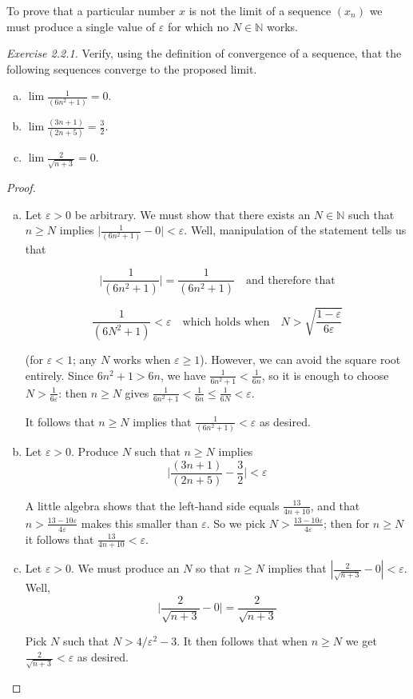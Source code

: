 To prove that a particular number $x$ is not the limit of a sequence $(x_{n})$ we must produce a single value of $\varepsilon$ for which no $N \in \mathbb{N}$ works.
\medskip

\noindent
\emph{Exercise 2.2.1.} Verify, using the definition of convergence of a sequence, that
the following sequences converge to the proposed limit.
\begin{enumerate}[(a)]
\item $\lim \frac{1}{(6n^{2}+1)} = 0$.
\item $\lim \frac{(3n+1)}{(2n+5)} = \frac{3}{2}$.
\item $\lim \frac{ 2}{\sqrt{n+3}} = 0$.
\end{enumerate}

\begin{proof}
	\begin{enumerate}[(a)]
			\item Let $\varepsilon > 0$ be arbitrary. We must show that there exists an
$N \in \mathbb{N}$ such that $n\geq N$ implies $\big|\frac{1}{(6n^{2}+1)} - 0 \big|  < \varepsilon$.  Well, manipulation of the statement tells us that 

$$\bigg|\frac{1}{(6n^{2}+1)} \bigg|  = \frac{1}{(6n^{2}+1)}  \quad \text{and therefore that}$$

$$ \frac{1}{(6N^{2}+1)}  < \varepsilon \quad \text{which holds when} \quad N > \sqrt{\frac{1- \varepsilon}{6\varepsilon}}$$

(for $\varepsilon < 1$; any $N$ works when $\varepsilon \geq 1$).  However, we can avoid the square root entirely.  Since $6n^2 + 1 > 6n$, we have $\frac{1}{6n^{2}+1} < \frac{1}{6n}$, so it is enough to choose $N > \frac{1}{6\varepsilon}$: then $n \geq N$ gives $\frac{1}{6n^2+1} < \frac{1}{6n} \leq \frac{1}{6N} < \varepsilon$.  

It follows that $n \geq N$  implies that $\frac{1}{(6n^{2}+1)}  < \varepsilon$ as desired.


\item  Let $\varepsilon>0$.  Produce $N$ such that $n\geq N$ implies
$$   \bigg|\frac{(3n+1)}{(2n+5)} -\frac{3}{2}\bigg| <  \varepsilon $$

A little algebra shows that the left-hand side equals $\frac{13}{4n+10}$, and that $n>\frac{13-10\varepsilon}{4\varepsilon}$ makes this smaller than $\varepsilon$.  So we pick $N >\frac{13-10\varepsilon}{4\varepsilon}$; then for $n \geq N$ it follows that $\frac{13}{4n+10} < \varepsilon$.


  \item Let $\varepsilon>0$.  We must produce an $N$ so that $n \geq N$ implies that $|\frac{2}{\sqrt{n+3}} - 0|< \varepsilon$.  Well,
  $$ \bigg| \frac{2}{\sqrt{n+3}} - 0 \bigg| = \frac{2}{\sqrt{n+3}} 	$$
  
  Pick $N$ such that $N > 4/{\varepsilon^2} - 3$.  It then follows that when $n \geq N$ we get $\frac{2}{\sqrt{n+3}} <\varepsilon$ as desired.
	\end{enumerate}
\end{proof}


